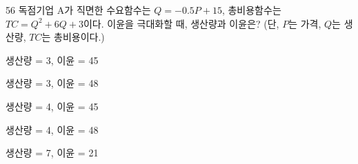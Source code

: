 \begin{question}{56}
독점기업 A가 직면한 수요함수는 $Q=-0.5P+15$, 총비용함수는 $TC=Q^{2}+6Q+3$이다. 이윤을 극대화할 때, 생산량과 이윤은? (단, $P$는 가격, $Q$는 생산량, $TC$는 총비용이다.)
\begin{choices}
  \item 생산량 = 3, 이윤 = 45
  \item 생산량 = 3, 이윤 = 48
  \item 생산량 = 4, 이윤 = 45
  \item 생산량 = 4, 이윤 = 48
  \item 생산량 = 7, 이윤 = 21
\end{choices}
\end{question}
